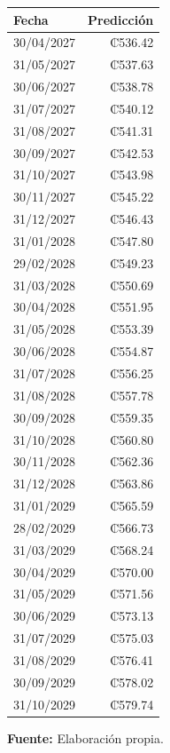 \documentclass[12pt]{article}
\begin{document}
\begin{table}[h!]
\begin{multicols}{2}
\columnbreak %

\noindent
\begin{tabular}{lr}
  \hline \hline
  Fecha & Predicción \\ 
  \hline
  30/04/2027 & ₡536.42 \\ 
  31/05/2027 & ₡537.63 \\ 
  30/06/2027 & ₡538.78 \\ 
  31/07/2027 & ₡540.12 \\ 
  31/08/2027 & ₡541.31 \\ 
  30/09/2027 & ₡542.53 \\ 
  31/10/2027 & ₡543.98 \\ 
  30/11/2027 & ₡545.22 \\ 
  31/12/2027 & ₡546.43 \\ 
  31/01/2028 & ₡547.80 \\ 
  29/02/2028 & ₡549.23 \\ 
  31/03/2028 & ₡550.69 \\ 
  30/04/2028 & ₡551.95 \\ 
  31/05/2028 & ₡553.39 \\ 
  30/06/2028 & ₡554.87 \\ 
  31/07/2028 & ₡556.25 \\ 
  31/08/2028 & ₡557.78 \\ 
  30/09/2028 & ₡559.35 \\ 
  31/10/2028 & ₡560.80 \\ 
  30/11/2028 & ₡562.36 \\ 
  31/12/2028 & ₡563.86 \\ 
  31/01/2029 & ₡565.59 \\ 
  28/02/2029 & ₡566.73 \\ 
  31/03/2029 & ₡568.24 \\ 
  30/04/2029 & ₡570.00 \\ 
  31/05/2029 & ₡571.56 \\ 
  30/06/2029 & ₡573.13 \\ 
  31/07/2029 & ₡575.03 \\ 
  31/08/2029 & ₡576.41 \\ 
  30/09/2029 & ₡578.02 \\ 
  31/10/2029 & ₡579.74 \\ 
  \hline \hline
\end{tabular}
\end{multicols}
\begin{tablenotes}
	\item[] \small\textbf{Fuente:} Elaboración propia.
\end{tablenotes}
\end{table}
\end{document}
